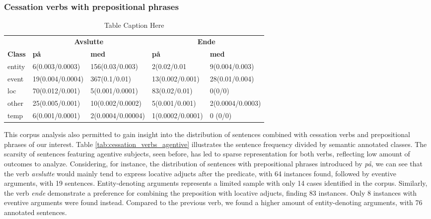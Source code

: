 \documentclass{article}
\begin{document}
\subsubsection{Cessation verbs with prepositional phrases}
\begin{table}[h!]
    \centering
    \begin{tabular}{lllll}
        \toprule
        & \multicolumn{2}{c}{\textbf{Avslutte}} & \multicolumn{2}{c}{\textbf{Ende}} \\
        \cmidrule(lr){2-3} \cmidrule(lr){4-5}
        \textbf{Class} & \textbf{på} & \textbf{med} & \textbf{på} & \textbf{med} \\
        \midrule
        \midrule
    entity &         6(0.003/0.0003) & 156(0.03/0.003)&2(0.02/0.01  &   9(0.004/0.003)\\
    event &         19(0.004/0.0004) & 367(0.1/0.01)& 13(0.002/0.001) & 28(0.01/0.004)\\
    loc &         70(0.012/0.001) & 5(0.001/0.0001)&  83(0.02/0.01) & 0(0/0)\\
    other &         25(0.005/0.001) & 10(0.002/0.0002)&  5(0.001/0.001) & 2(0.0004/0.0003)   \\
    temp &          6(0.001/0.0001) & 2(0.0004/0.00004)& 1(0.0002/0.0001)  & 0 (0/0)  \\
        \bottomrule
    \end{tabular}
    \caption{Table Caption Here}
    \label{tab:mytable}
\end{table}
\noindent This corpus analysis also permitted to gain insight into the distribution of sentences combined with cessation verbs and prepositional phrases of our interest. Table \ref{tab:cessation_verbs_agentive} illustrates the sentence frequency divided by semantic annotated classes. The scarsity of sentences featuring agentive subjects, seen before, has led to sparse representation for both verbs, reflecting low amount of outcomes to analyze. Considering, for instance, the distribution of sentences with prepositional phrases introduced by \emph{på}, we can see that the verb \emph{avslutte} would mainly tend to express locative adjucts after the predicate, with 64 instances found, followed by eventive arguments, with 19 sentences. Entity-denoting arguments represents a limited sample with only 14 cases identified in the corpus. Similarly, the verb \emph{ende} demonstrate a preference for combining the preposition with locative adjucts, finding 83 instances. Only 8 instances with eventive arguments were found instead. Compared to the previous verb, we found a higher amount of entity-denoting arguments, with 76 annotated sentences.
\end{document}
